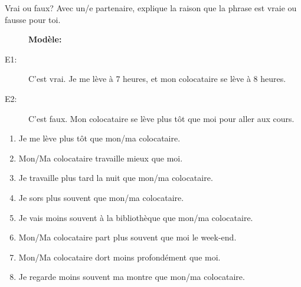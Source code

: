 \begin{frame}{Vrai ou faux?}
  Avec un/e partenaire, explique la raison que la phrase est vraie ou fausse pour toi. \\
  {\scriptsize
  \begin{description}
    \item[] \textbf{Modèle:} 
    \item[E1:] C'est vrai. Je me lève à 7 heures, et mon colocataire se lève à 8 heures.
    \item[E2:] C'est faux. Mon colocataire se lève plus tôt que moi pour aller aux cours.
  \end{description}
  \begin{enumerate}
    \item Je me lève plus tôt que mon/ma colocataire.
    \item Mon/Ma colocataire travaille mieux que moi.
    \item Je travaille plus tard la nuit que mon/ma colocataire.
    \item Je sors plus souvent que mon/ma colocataire.
    \item Je vais moins souvent à la bibliothèque que mon/ma colocataire.
    \item Mon/Ma colocataire part plus souvent que moi le week-end.
    \item Mon/Ma colocataire dort moins profondément que moi.
    \item Je regarde moins souvent ma montre que mon/ma colocataire.
  \end{enumerate}
  }
\end{frame}
